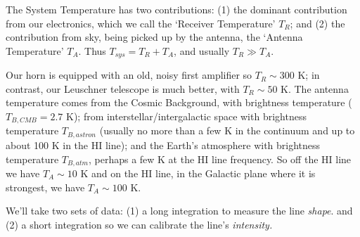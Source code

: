 \documentclass[12pt,preprint]{aastex}
\begin{document}
The System Temperature has two contributions: (1) the dominant contribution
  from our electronics, which we call the `Receiver Temperature' $T_R$;
  and (2) the contribution from sky, being picked up by the antenna, the
  `Antenna Temperature' $T_A$. Thus $T_{sys}=T_R + T_A$, and usually
  $T_R \gg T_A$. 

Our horn is equipped with an old, noisy first amplifier so $T_R \sim
300$ K; in contrast, our Leuschner telescope is much better, with $T_R
\sim 50$ K. The antenna temperature comes from the Cosmic Background,
with brightness temperature ($T_{B,CMB} = 2.7$ K); from
interstellar/intergalactic space with brightness temperature
$T_{B,astron}$ (usually no more than a few K in the continuum and up to
about 100 K in the HI line); and the Earth's atmosphere with brightness
temperature $T_{B,atm}$, perhaps a few K at the HI line frequency. So
off the HI line we have $T_A \sim 10$ K and on the HI line, in the
Galactic plane where it is strongest, we have $T_A \sim 100$ K.

We'll take two sets of data: (1) a long integration to measure the line
{\it shape}. and (2) a short integration so we can calibrate the line's
{\it intensity.}
\end{document}
